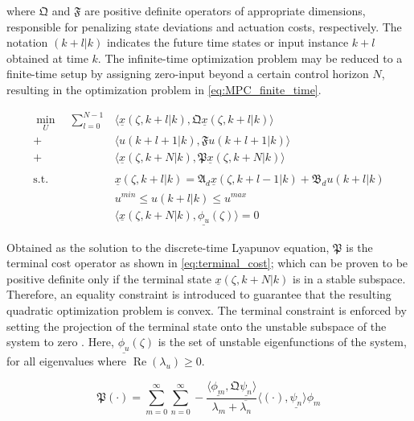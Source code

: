 where $\mathfrak{Q}$ and $\mathfrak{F}$ are positive definite operators of appropriate dimensions, responsible for penalizing state deviations and actuation costs, respectively. The notation $(k+l|k)$ indicates the future time states or input instance $k+l$ obtained at time $k$. The infinite-time optimization problem may be reduced to a finite-time setup by assigning zero-input beyond a certain control horizon $N$, resulting in the optimization problem in \eqref{eq:MPC_finite_time}.

\begin{equation} \label{eq:MPC_finite_time}
    \begin{aligned}
        \min_{U} \quad \sum_{l=0}^{N-1} &\langle \underline{x}(\zeta, k+l | k), \mathfrak{Q} \underline{x}(\zeta, k+l | k) \rangle \\
        + &\langle u(k+l+1 | k), \mathfrak{F} u(k+l+1|k) \rangle \\
        + &\langle \underline{x}(\zeta, k+N | k), \mathfrak{P} \underline{x}(\zeta, k+N | k) \rangle \\
        \, \\
        \text{s.t.} \quad &\underline{x}(\zeta, k+l | k) = \mathfrak{A}_d \underline{x}(\zeta, k+l-1 | k) + \mathfrak{B}_d u(k+l | k) \\
        &u^{min} \leq u(k+l | k) \leq u^{max} \\
        & \langle \underline{x}(\zeta, k+N | k), \underline{\phi_u}(\zeta) \rangle = 0
    \end{aligned}
\end{equation}

Obtained as the solution to the discrete-time Lyapunov equation, $\mathfrak{P}$ is the terminal cost operator as shown in \eqref{eq:terminal_cost}; which can be proven to be positive definite only if the terminal state $\underline{x}(\zeta, k+N | k)$ is in a stable subspace. Therefore, an equality constraint is introduced to guarantee that the resulting quadratic optimization problem is convex. The terminal constraint is enforced by setting the projection of the terminal state onto the unstable subspace of the system to zero \cite{Curtain2020Introduction, xu2017linear,Khatibi2021Model}. Here, $\underline{\phi_u}(\zeta)$ is the set of unstable eigenfunctions of the system, for all eigenvalues where $\operatorname{Re}(\lambda_u) \geq 0$.

\begin{equation} \label{eq:terminal_cost}
    \mathfrak{P} (\cdot) = \sum_{m=0}^{\infty} \sum_{n=0}^{\infty} 
    -\frac{
        \langle \underline{\phi_m} , \mathfrak{Q} \underline{\psi_n} \rangle
    }{
        \lambda_m + \overline{\lambda_n}
    }
    \langle (\cdot) , \underline{\psi_n} \rangle \phi_m
\end{equation}

